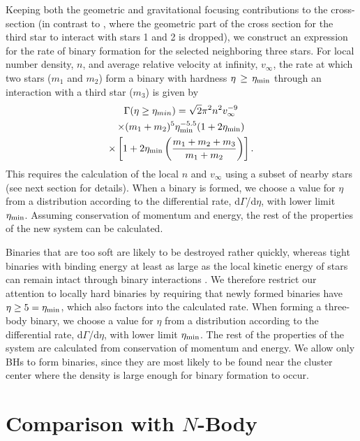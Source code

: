 \documentclass[12pt,preprint]{aastex}
\begin{document}
Keeping both the geometric and gravitational focusing contributions to
the cross-section (in contrast to \citealt{Ivanova2010}, where the  %
geometric part of the cross section for the third star to interact
with stars 1 and 2 is dropped), we construct an expression for the
rate of binary formation for the selected neighboring three stars.
 For local number density, $n$, and
average relative velocity at infinity, $v_{\infty}$, the rate at which
two stars ($m_1$ and $m_2$) form a binary with hardness $\eta \, \geq
\, \eta_{\rm min}$ through an interaction with a third star ($m_3$) is
given by
\begin{multline}
\Gamma(\eta \geq \eta_{min}) = \sqrt{2} \pi^2 n^2
      {v_{\infty}^{-9}} \\ \times (m_1 + m_2)^5 \eta_{\rm min}^{-5.5} (1 + 2
      \eta_{\rm min}) \\ \times \left[ 1+2 \eta_{\rm min} \left( \frac{ m_1 + m_2 +
            m_3}{m_1 + m_2 } \right) \right].
\label{eq:Gamma}
\end{multline}
This requires the calculation of the local $n$ and $v_{\infty}$ using a subset
of nearby stars (see next section for details).
When a binary is formed, we choose a
value for $\eta$ from a distribution according to the differential
rate, d$\Gamma$/d$\eta$, with lower limit $\eta_{\rm min}$. 
Assuming conservation of momentum and energy, the rest of the 
properties of the new system can be calculated. 

Binaries that are too soft are likely to be destroyed rather quickly,
whereas tight binaries with binding energy at least as large as the 
local kinetic energy of stars can remain intact through binary interactions
 \citep{Heggie1975}. We therefore restrict our attention to locally
 hard binaries by requiring that newly formed binaries have
$\eta \geq 5 = \eta_{\rm min}$, which also factors into the calculated rate.
When forming a three-body binary, we choose a
value for $\eta$ from a distribution according to the differential
rate, d$\Gamma$/d$\eta$, with lower limit $\eta_{\rm min}$. The rest
of the properties of the system are calculated from conservation of
momentum and energy.
We allow only BHs to form binaries, since they 
are most likely to be found near the cluster center where the density is large 
enough for binary formation to occur. 

\section{Comparison with $N$-Body}
\end{document}
